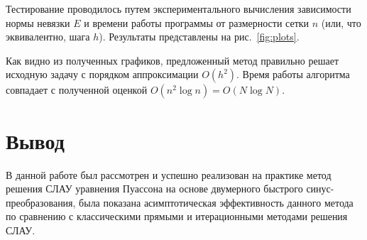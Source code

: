 \documentclass[a4paper]{article}
\begin{document}
		Тестирование проводилось путем экспериментального вычисления зависимости нормы невязки $E$ и времени работы программы от размерности сетки $n$ (или, что эквивалентно, шага $h$). Результаты представлены на рис.~\ref{fig:plots}. 

	
		Как видно из полученных графиков, предложенный метод правильно решает исходную задачу с порядком аппроксимации $O(h^2)$. Время работы алгоритма совпадает с полученной оценкой $O(n^2\log n)=O(N\log N)$.
	\section{Вывод}
		В данной работе был рассмотрен и успешно реализован на практике метод решения СЛАУ уравнения Пуассона на основе двумерного быстрого синус-преобразования, была показана асимптотическая эффективность данного метода по сравнению с классическими прямыми и итерационными методами решения СЛАУ.
\end{document}
